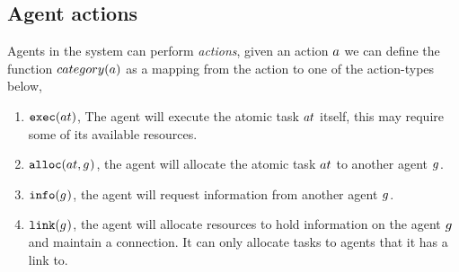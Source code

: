 \subsection{Agent actions}
\label{section:actions}

Agents in the system can perform \textit{actions}, given an action $\varAction{}{}$ we can define the function $\functionAgentActionType{}{}$ as a mapping from the action to one of the action-types below, 

\begin{enumerate}
	\item $\functionExec{}{}$, The agent will execute the atomic task $\varAtomicTask{}{}$ itself, this may require some of its available resources.
	\item $\functionAlloc{}{}$, the agent will allocate the atomic task $\varAtomicTask{}{}$ to another agent $g_{}^{}$.
	\item $\functionInfo{}{}$, the agent will request information from another agent $g_{}^{}$.
	\item $\functionLink{}{}$, the agent will allocate resources to hold information on the agent $g_{}^{}$ and maintain a connection. It can only allocate tasks to agents that it has a link to.
\end{enumerate}